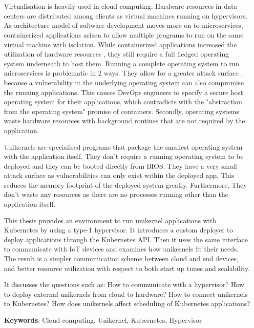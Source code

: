 \chapter{\abstractname}

Virtualisation is heavily used in cloud computing. Hardware resources in data centers are distributed among clients as virtual machines running on hypervisors. As architecture model of software development moves more on to microservices, containerized applications arisen to allow multiple programs to run on the same virtual machine with isolation. While containerized applications increased the utilization of hardware resources , they still require a full fledged operating system underneath to host them.
Running a complete operating system to run microservices is problematic in 2 ways. They allow for a greater attack surface , because a vulnerability in the underlying operating system can also compromise the running applications. This causes DevOps engineers to specify a secure host operating system for their applications, which contradicts with the "abstraction from the operating system" promise of containers. Secondly, operating systems waste hardware resources with background routines that are not required by the application.

Unikernels are specialised programs that package the smallest operating system with the application itself. They don't require a running operating system to be deployed and they can be booted directly from BIOS. They have a very small attack surface as vulnerabilities can only exist within the deployed app. This reduces the memory footprint of the deployed system greatly. Furthermore, They don't waste any resources as there are no processes running other than the application itself.

This thesis provides an environment to run unikernel applications with Kubernetes by using a type-1 hypervisor. It introduces a custom deployer to deploy applications through the Kubernetes API. Then it uses the same interface to communicate with IoT devices and examines how unikernels fit their needs. The result is a simpler communication scheme between cloud and end devices, and better resource utilization with respect to both start up times and scalability.

It discusses the questions such as: How to communicate with a hypervisor? How to deploy external unikernels from cloud to hardware? How to connect unikernels to Kubernetes? How does unikernels affect scheduling of Kubernetes applications?

\textbf{Keywords}: Cloud computing, Unikernel, Kubernetes, Hypervisor
